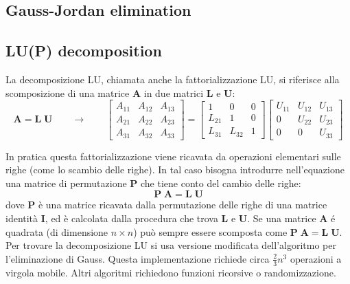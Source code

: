 \documentclass[10pt]{article}
\begin{document}
\subsection{Gauss-Jordan elimination}


\subsection{LU(P) decomposition}

La decomposizione LU, chiamata anche la fattorializzazione LU, si riferisce alla scomposizione di una matrice $\mathbf{A}$ in due matrici $\mathbf{L}$ e $\mathbf{U}$:
\begin{equation}
\mathbf{A} = \mathbf{L} \; \mathbf{U}
\qquad \rightarrow \qquad
\begin{bmatrix}
A_{11} & A_{12} & A_{13} \\
A_{21} & A_{22} & A_{23} \\
A_{31} & A_{32} & A_{33}
\end{bmatrix} = 
\begin{bmatrix}
1 & 0 & 0 \\
L_{21} & 1 & 0 \\
L_{31} & L_{32} & 1
\end{bmatrix}
\begin{bmatrix}
U_{11} & U_{12} & U_{13} \\
0      & U_{22} & U_{23} \\
0      & 0      & U_{33}
\end{bmatrix}
\end{equation}

In pratica questa fattorializzazione viene ricavata da operazioni elementari sulle righe (come lo scambio delle righe). In tal caso bisogna introdurre nell'equazione una matrice di permutazione $\mathbf{P}$ che tiene conto del cambio delle righe:
\begin{equation}
\mathbf{P} \; \mathbf{A} = \mathbf{L} \; \mathbf{U}
\label{eq:LUp}
\end{equation}
dove $\mathbf{P}$ è una matrice ricavata dalla permutazione delle righe di una matrice identità $\mathbf{I}$, ed è calcolata dalla procedura che trova $\mathbf{L}$ e $\mathbf{U}$.
Se una matrice $\mathbf{A}$ é quadrata (di dimensione $n\times n$) può sempre essere scomposta come $\mathbf{P} \; \mathbf{A} = \mathbf{L} \; \mathbf{U}$.
Per trovare la decomposizione LU si usa versione modificata dell'algoritmo per l'eliminazione di Gauss. Questa implementazione richiede circa $\frac{2}{3}n^3$ operazioni a virgola mobile. Altri algoritmi richiedono funzioni ricorsive o randomizzazione.
\end{document}
